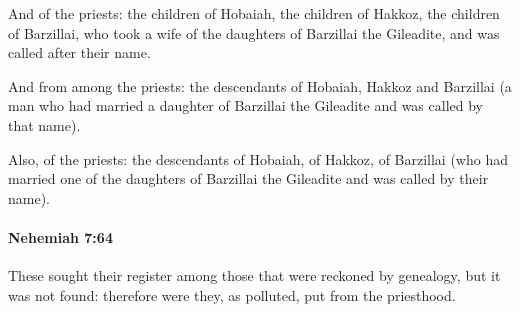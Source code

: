 			\begin{versebox}
					\item[BHS] 
					\item[LXX] 
					\item[ASV] And of the priests: the children of Hobaiah, the children of Hakkoz, the children of Barzillai, who took a wife of the daughters of Barzillai the Gileadite, and was called after their name.
					\item[NIV] And from among the priests: the descendants of Hobaiah, Hakkoz and Barzillai (a man who had married a daughter of Barzillai the Gileadite and was called by that name).
					\item[NRSV] Also, of the priests: the descendants of Hobaiah, of Hakkoz, of Barzillai (who had married one of the daughters of Barzillai the Gileadite and was called by their name).
			\end{versebox}

		\paragraph{Nehemiah 7:64} %
			\label{NEHEMIAH-7-64}

			These sought their register among those that were reckoned by genealogy, but it was not found: therefore were they, as polluted, put from the priesthood.

